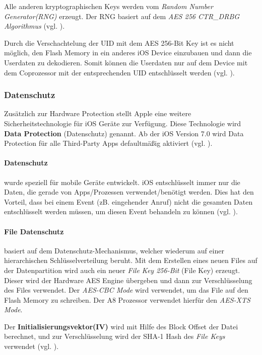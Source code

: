 Alle anderen kryptographischen Keys werden vom \textit{\glqq Random Number Generator(RNG)\grqq{}} erzeugt. Der RNG basiert auf dem \textit{\glqq AES 256 CTR\_DRBG Algorithmus\grqq{}} (vgl. \cite{iOSSec[5], iOSSec[2],iOSSec[1], Apple[4], Apple[5], Apple[6], Apple[3]}).

Durch die Verschachtelung der UID mit dem AES 256-Bit Key ist es nicht möglich, den Flash Memory in ein anderes iOS Device einzubauen und dann die Userdaten zu dekodieren. Somit können die Userdaten nur auf dem Device mit dem Coprozessor mit der entsprechenden UID entschlüsselt werden (vgl. \cite{iOSSec[5], iOSSec[2],iOSSec[1], Apple[4], Apple[5], Apple[6], Apple[3]}).

\subsubsection{Datenschutz}
\label{sec:DataProtection}

Zusätzlich zur Hardware Protection stellt Apple eine weitere Sicherheitstechnologie für iOS Geräte zur Verfügung. Diese Technologie wird \textbf{Data Protection}  (Datenschutz) genannt. Ab der iOS Version 7.0 wird Data Protection für alle Third-Party Apps defaultmäßig aktiviert (vgl. \cite{iOSSec[5], iOSSec[2],iOSSec[1], Apple[4], Apple[5], Apple[6], Apple[3]}).

\paragraph{Datenschutz} wurde speziell für mobile Geräte entwickelt. iOS entschlüsselt immer nur die Daten, die gerade von Apps/Prozessen verwendet/benötigt werden. Dies hat den Vorteil, dass bei einem Event (zB. eingehender Anruf) nicht die gesamten Daten entschlüsselt werden müssen, um diesen Event behandeln zu können (vgl. \cite{Apple[4]}).

\paragraph{File Datenschutz} basiert auf dem Datenschutz-Mechanismus, welcher wiederum auf einer hierarchischen Schlüsselverteilung beruht. Mit dem Erstellen eines neuen Files auf der Datenpartition wird auch ein neuer \textit{\glqq File Key 256-Bit\grqq{}} (\glqq File Key\grqq) erzeugt. Dieser wird der Hardware AES Engine übergeben und dann zur Verschlüsselung des Files verwendet.  Der \textit{\glqq AES-CBC Mode\grqq{}} wird verwendet, um das File auf den Flash Memory zu schreiben. Der A8 Prozessor verwendet hierfür den \textit{\glqq AES-XTS Mode\grqq{}}.  \par
Der \textbf{Initialisierungsvektor(IV)} wird mit Hilfe des Block Offset der Datei berechnet, und zur Verschlüsselung wird der SHA-1 Hash des \textit{\glqq File Keys\grqq{}} verwendet (vgl. \cite{iOSSec[5], iOSSec[2],iOSSec[1], Apple[4], Apple[5], Apple[6], Apple[3]}).


